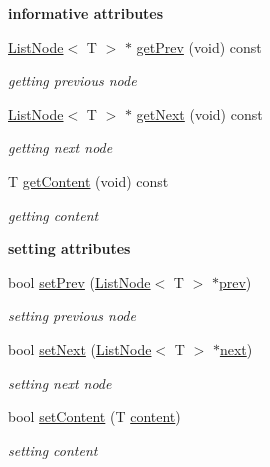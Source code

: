 \begin{Indent}{\bf informative attributes}\par
\begin{DoxyCompactItemize}
\item 
\hyperlink{class_list_node}{List\-Node}$<$ T $>$ $\ast$ \hyperlink{class_list_node_ac306f4fad1304c1e45e4b298b658ded9}{get\-Prev} (void) const 
\begin{DoxyCompactList}\small\item\em getting previous node \end{DoxyCompactList}\item 
\hyperlink{class_list_node}{List\-Node}$<$ T $>$ $\ast$ \hyperlink{class_list_node_a35941e2759ff02e220815f806d0f7858}{get\-Next} (void) const 
\begin{DoxyCompactList}\small\item\em getting next node \end{DoxyCompactList}\item 
T \hyperlink{class_list_node_a53d6da0c514950a40956955bc1e383ab}{get\-Content} (void) const 
\begin{DoxyCompactList}\small\item\em getting content \end{DoxyCompactList}\end{DoxyCompactItemize}
\end{Indent}
\begin{Indent}{\bf setting attributes}\par
\begin{DoxyCompactItemize}
\item 
bool \hyperlink{class_list_node_a66ddf2d4a22600f256d93a3f60740c13}{set\-Prev} (\hyperlink{class_list_node}{List\-Node}$<$ T $>$ $\ast$\hyperlink{class_list_node_a997ca532d810ebd030726ff880ba76b5}{prev})
\begin{DoxyCompactList}\small\item\em setting previous node \end{DoxyCompactList}\item 
bool \hyperlink{class_list_node_a98d9eb542018713a5fc8d284aa62b3a5}{set\-Next} (\hyperlink{class_list_node}{List\-Node}$<$ T $>$ $\ast$\hyperlink{class_list_node_a97909c9598053ffd24b77ec715f745f1}{next})
\begin{DoxyCompactList}\small\item\em setting next node \end{DoxyCompactList}\item 
bool \hyperlink{class_list_node_af6f3ae03b93789922f0482f285a05a3a}{set\-Content} (T \hyperlink{class_list_node_a75aabe0bfbeace74391ab20546454e05}{content})
\begin{DoxyCompactList}\small\item\em setting content \end{DoxyCompactList}\end{DoxyCompactItemize}
\end{Indent}
